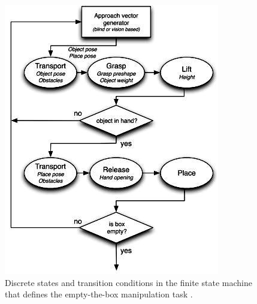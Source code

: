 \begin{figure}[hbt]
	\centering
	\includegraphics[width=\linewidth]{images/grasp_fsm}
	\caption{Discrete states and transition conditions in the finite state machine that defines the empty-the-box manipulation task \cite{felip2011emptying}.}
	\label{fig:grasp_fsm}
\end{figure}


